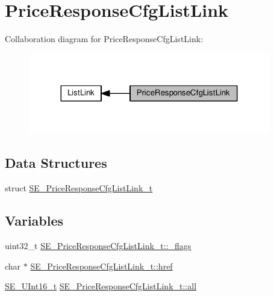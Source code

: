 \hypertarget{group__PriceResponseCfgListLink}{}\section{Price\+Response\+Cfg\+List\+Link}
\label{group__PriceResponseCfgListLink}
Collaboration diagram for Price\+Response\+Cfg\+List\+Link\+:\nopagebreak
\begin{figure}[H]
\begin{center}
\leavevmode
\includegraphics[width=299pt]{group__PriceResponseCfgListLink}
\end{center}
\end{figure}
\subsection*{Data Structures}
\begin{DoxyCompactItemize}
\item 
struct \hyperlink{structSE__PriceResponseCfgListLink__t}{S\+E\+\_\+\+Price\+Response\+Cfg\+List\+Link\+\_\+t}
\end{DoxyCompactItemize}
\subsection*{Variables}
\begin{DoxyCompactItemize}
\item 
uint32\+\_\+t \hyperlink{group__PriceResponseCfgListLink_gabc4cbe7ac6f6ff978fe6bf45dfd3efcd}{S\+E\+\_\+\+Price\+Response\+Cfg\+List\+Link\+\_\+t\+::\+\_\+flags}
\item 
char $\ast$ \hyperlink{group__PriceResponseCfgListLink_ga251e7e1e13f7186865ef9cee46ae1ca8}{S\+E\+\_\+\+Price\+Response\+Cfg\+List\+Link\+\_\+t\+::href}
\item 
\hyperlink{group__UInt16_gac68d541f189538bfd30cfaa712d20d29}{S\+E\+\_\+\+U\+Int16\+\_\+t} \hyperlink{group__PriceResponseCfgListLink_gadf74318e90daf92ff98a6f3a3d2e2c2b}{S\+E\+\_\+\+Price\+Response\+Cfg\+List\+Link\+\_\+t\+::all}
\end{DoxyCompactItemize}


